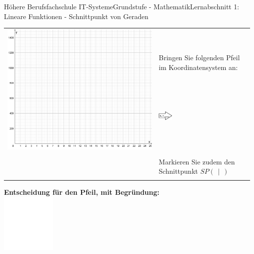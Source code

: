 \documentclass[oneside,openany,headings=optiontotoc,11pt,numbers=noenddot]{scrreprt}
\begin{document}
\begin{worksheet}{Höhere Berufsfachschule IT-Systeme}{Grundstufe - Mathematik}{Lernabschnitt 1: Lineare Funktionen - Schnittpunkt von Geraden}
\begin{tabularx}{1.25\textwidth}{X|L{3cm}|}
			 & Bringen Sie folgenden Pfeil im Koordinatensystem an:\\
			& \includegraphics[width=0.15\textwidth,align=b]{../99_Bilder/arrow-x.png}\\
			& \\
			\\
			& \\
			& Markieren Sie zudem den Schnittpunkt \(SP(\ \ |\ \ )\)\\
			& \\
		\end{tabularx}
		\newpage
		\begin{framed}
			\noindent
			\textbf{Entscheidung für den Pfeil, mit Begründung:}\\
			\includegraphics[width=0.2\textwidth]{../../empty.jpg}
		\end{framed}
		\begin{framed}

\end{framed}
\end{worksheet}
\end{document}
